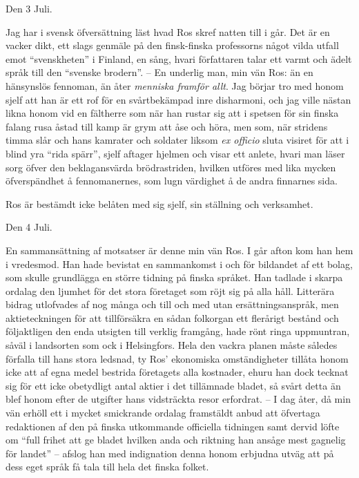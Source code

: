 Den 3 Juli.

Jag har i svensk öfversättning läst hvad Ros skref natten till i går.
Det är en vacker dikt, ett slags genmäle på den finsk-finska professorns
något vilda utfall emot ``svenskheten'' i Finland, en sång, hvari
författaren talar ett varmt och ädelt språk till den ``svenske
brodern''. -- En underlig man, min vän Ros: än en hänsynslös fennoman,
än åter \emph{menniska framför allt}. Jag börjar tro med honom sjelf att
han är ett rof för en svårtbekämpad inre disharmoni, och jag ville
nästan likna honom vid en fältherre som när han rustar sig att i spetsen
för sin finska falang rusa åstad till kamp är grym att åse och höra, men
som, när stridens timma slår och hans kamrater och soldater liksom
\emph{ex officio} sluta visiret för att i blind yra ``rida spärr'',
sjelf aftager hjelmen och visar ett anlete, hvari man läser sorg öfver
den beklagansvärda brödrastriden, hvilken utföres med lika mycken
öfverspändhet å fennomanernes, som lugn värdighet å de andra finnarnes
sida.

Ros är bestämdt icke belåten med sig sjelf, sin ställning och
verksamhet.

Den 4 Juli.

En sammansättning af motsatser är denne min vän Ros. I går afton kom han
hem i vredesmod. Han hade bevistat en sammankomst i och för bildandet af
ett bolag, som skulle grundlägga en större tidning på finska språket.
Han tadlade i skarpa ordalag den ljumhet för det stora företaget som
röjt sig på alla håll. Litterära bidrag utlofvades af nog många och till
och med utan ersättningsanspråk, men aktieteckningen för att
tillförsäkra en sådan folkorgan ett flerårigt bestånd och följaktligen
den enda utsigten till verklig framgång, hade rönt ringa uppmuntran,
såväl i landsorten som ock i Helsingfors. Hela den vackra planen måste
således förfalla till hans stora ledsnad, ty Ros' ekonomiska
omständigheter tillåta honom icke att af egna medel bestrida företagets
alla kostnader, ehuru han dock tecknat sig för ett icke obetydligt antal
aktier i det tillämnade bladet, så svårt detta än blef honom efter de
utgifter hans vidsträckta resor erfordrat. -- I dag åter, då min vän
erhöll ett i mycket smickrande ordalag framstäldt anbud att öfvertaga
redaktionen af den på finska utkommande officiella tidningen samt dervid
löfte om ``full frihet att ge bladet hvilken anda och riktning han
ansåge mest gagnelig för landet'' -- afslog han med indignation denna
honom erbjudna utväg att på dess eget språk få tala till hela det finska
folket.

